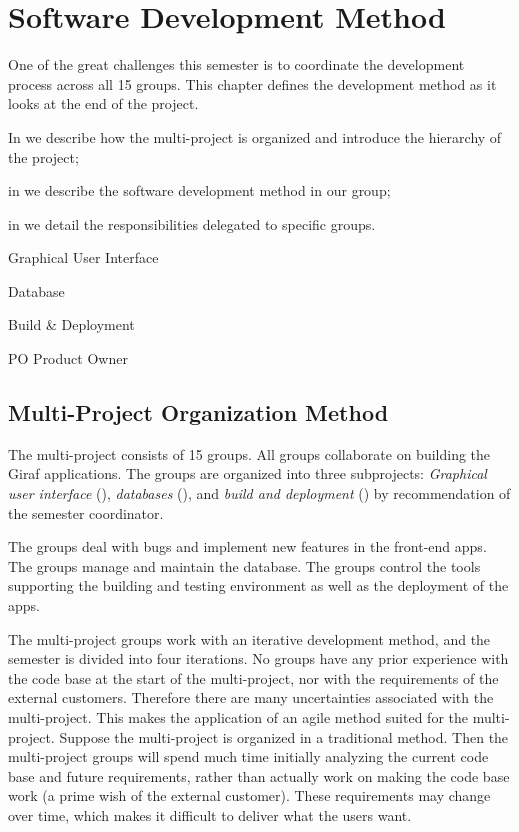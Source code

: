 \chapter{Software Development Method}\label{chap:sw_dev_method}
One of the great challenges this semester is to coordinate the development process across all 15 groups. This chapter defines the development method as it looks at the end of the project.

\begin{chapterorganization}
  \item In  we describe how the multi-project is organized and introduce the hierarchy of the project;
  \item in  we describe the software development method in our group;
  \item in  we detail the responsibilities delegated to specific groups.
\end{chapterorganization}

\begin{abbreviations}
  \item[\gui] Graphical User Interface
  \item[\db] Database
  \item[\bd] Build \& Deployment
  \item[PO] Product Owner
\end{abbreviations}

\section{Multi-Project Organization Method}\label{sec:project_overview}
The multi-project consists of 15 groups. All groups collaborate on building the Giraf applications. The groups are organized into three subprojects: \emph{Graphical user interface} (\gui), \emph{databases} (\db), and \emph{build and deployment} (\bd) by recommendation of the semester coordinator.

The \gui groups deal with bugs and implement new features in the front-end apps. The \db groups manage and maintain the database. The \bd groups control the tools supporting the building and testing environment as well as the deployment of the apps.

The multi-project groups work with an iterative development method, and the semester is divided into four iterations. No groups have any prior experience with the code base at the start of the multi-project, nor with the requirements of the external customers. Therefore there are many uncertainties associated with the multi-project. This makes the application of an agile method suited for the multi-project. Suppose the multi-project is organized in a traditional method. Then the multi-project groups will spend much time initially analyzing the current code base and future requirements, rather than actually work on making the code base work (a prime wish of the external customer). These requirements may change over time, which makes it difficult to deliver what the users want.

